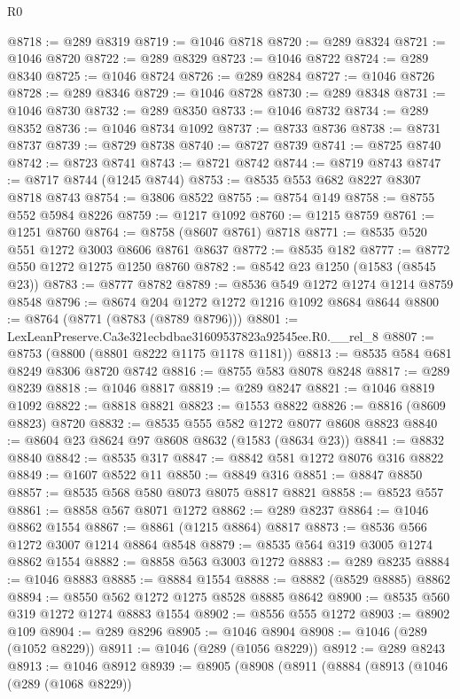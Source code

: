 \begin{lexlean}{R0}
\begin{coremodule}
@8718 := @289 @8319
@8719 := @1046 @8718
@8720 := @289 @8324
@8721 := @1046 @8720
@8722 := @289 @8329
@8723 := @1046 @8722
@8724 := @289 @8340
@8725 := @1046 @8724
@8726 := @289 @8284
@8727 := @1046 @8726
@8728 := @289 @8346
@8729 := @1046 @8728
@8730 := @289 @8348
@8731 := @1046 @8730
@8732 := @289 @8350
@8733 := @1046 @8732
@8734 := @289 @8352
@8736 := @1046 @8734 @1092
@8737 := @8733 @8736
@8738 := @8731 @8737
@8739 := @8729 @8738
@8740 := @8727 @8739
@8741 := @8725 @8740
@8742 := @8723 @8741
@8743 := @8721 @8742
@8744 := @8719 @8743
@8747 := @8717 @8744 (@1245 @8744)
@8753 := @8535 @553 @682 @8227 @8307 @8718 @8743
@8754 := @3806 @8522
@8755 := @8754 @149
@8758 := @8755 @552 @5984 @8226
@8759 := @1217 @1092
@8760 := @1215 @8759
@8761 := @1251 @8760
@8764 := @8758 (@8607 @8761) @8718
@8771 := @8535 @520 @551 @1272 @3003 @8606 @8761 @8637
@8772 := @8535 @182
@8777 := @8772 @550 @1272 @1275 @1250 @8760
@8782 := @8542 @23 @1250 (@1583 (@8545 @23))
@8783 := @8777 @8782
@8789 := @8536 @549 @1272 @1274 @1214 @8759 @8548
@8796 := @8674 @204 @1272 @1272 @1216 @1092 @8684 @8644
@8800 := @8764 (@8771 (@8783 (@8789 @8796)))
@8801 := LexLeanPreserve.Ca3e321ecbdbae31609537823a92545ee.R0.__rel_8
@8807 := @8753 (@8800 (@8801 @8222 @1175 @1178 @1181))
@8813 := @8535 @584 @681 @8249 @8306 @8720 @8742
@8816 := @8755 @583 @8078 @8248
@8817 := @289 @8239
@8818 := @1046 @8817
@8819 := @289 @8247
@8821 := @1046 @8819 @1092
@8822 := @8818 @8821
@8823 := @1553 @8822
@8826 := @8816 (@8609 @8823) @8720
@8832 := @8535 @555 @582 @1272 @8077 @8608 @8823
@8840 := @8604 @23 @8624 @97 @8608 @8632 (@1583 (@8634 @23))
@8841 := @8832 @8840
@8842 := @8535 @317
@8847 := @8842 @581 @1272 @8076 @316 @8822
@8849 := @1607 @8522 @11
@8850 := @8849 @316
@8851 := @8847 @8850
@8857 := @8535 @568 @580 @8073 @8075 @8817 @8821
@8858 := @8523 @557
@8861 := @8858 @567 @8071 @1272
@8862 := @289 @8237
@8864 := @1046 @8862 @1554
@8867 := @8861 (@1215 @8864) @8817
@8873 := @8536 @566 @1272 @3007 @1214 @8864 @8548
@8879 := @8535 @564 @319 @3005 @1274 @8862 @1554
@8882 := @8858 @563 @3003 @1272
@8883 := @289 @8235
@8884 := @1046 @8883
@8885 := @8884 @1554
@8888 := @8882 (@8529 @8885) @8862
@8894 := @8550 @562 @1272 @1275 @8528 @8885 @8642
@8900 := @8535 @560 @319 @1272 @1274 @8883 @1554
@8902 := @8556 @555 @1272
@8903 := @8902 @109
@8904 := @289 @8296
@8905 := @1046 @8904
@8908 := @1046 (@289 (@1052 @8229))
@8911 := @1046 (@289 (@1056 @8229))
@8912 := @289 @8243
@8913 := @1046 @8912
@8939 := @8905
    (@8908
      (@8911
        (@8884
          (@8913
            (@1046
              (@289 (@1068 @8229))

\end{coremodule}
\end{lexlean}
